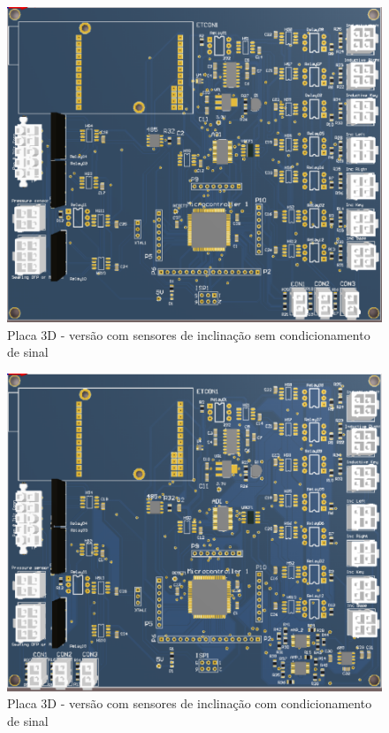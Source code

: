 \begin{figure}[H]
\centering
\includegraphics[width=1\columnwidth]{figs/eletronica/placav21.png}
\caption{Placa 3D - versão com sensores de inclinação sem condicionamento de
sinal}
\label{placav21}
\end{figure}

\begin{figure}[H]
\centering
\includegraphics[width=1\columnwidth]{figs/eletronica/placav22.png}
\caption{Placa 3D - versão com sensores de inclinação com condicionamento de
sinal}
\label{placav22}
\end{figure}


